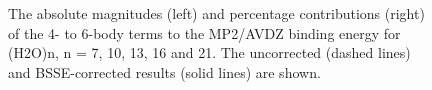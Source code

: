 \begin{figure}[t]
\begin{center}
\begin{minipage}{0.45\textwidth}
\end{minipage}
\end{center}
\begin{spacing}{1.0}
\caption[The absolute magnitudes (left) and percentage contributions (right) of the 4- to 6-body terms to the MP2/AVDZ binding energy for (H2O)n, n = 7, 10, 13, 16 and 21. The uncorrected (dashed lines) and BSSE-corrected results (solid lines) are shown.]{The absolute magnitudes (left) and percentage contributions (right) of the 4- to 6-body terms to the MP2/AVDZ binding energy for (H2O)n, n = 7, 10, 13, 16 and 21. The uncorrected (dashed lines) and BSSE-corrected results (solid lines) are shown.}\label{fig:MBE_I_F5}
\end{spacing}
\end{figure}